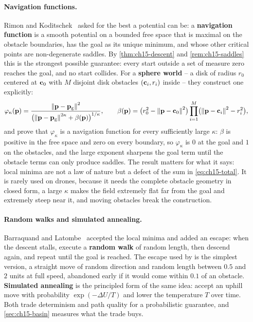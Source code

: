 \paragraph{Navigation functions.}
Rimon and Koditschek~\cite{rimon1992exact,koditschek1990navigation} asked
for the best a potential can be: a \textbf{navigation
function} is a smooth potential on a bounded free
space that is maximal on the obstacle boundaries, has the goal as its
unique minimum, and whose other critical points are non-degenerate saddles.
By \cref{thm:ch15-descent} and \cref{rem:ch15-saddles} this is the strongest
possible guarantee: every start outside a set of measure zero reaches the
goal, and no start collides. For a \textbf{sphere world}
-- a disk of radius $r_0$ centered at $\mathbf{c}_0$ with $M$ disjoint disk
obstacles $(\mathbf{c}_i, r_i)$ inside -- they construct one explicitly:
\begin{equation}
  \varphi_\kappa(\mathbf{p}) = \frac{\left\lVert \mathbf{p} - \mathbf{p}_{\mathrm{g}} \right\rVert^2}
    {\bigl( \left\lVert \mathbf{p} - \mathbf{p}_{\mathrm{g}} \right\rVert^{2\kappa} + \beta(\mathbf{p}) \bigr)^{1/\kappa}},
  \qquad
  \beta(\mathbf{p}) = \bigl( r_0^2 - \left\lVert \mathbf{p} - \mathbf{c}_0 \right\rVert^2 \bigr) \prod_{i=1}^{M} \bigl( \left\lVert \mathbf{p} - \mathbf{c}_i \right\rVert^2 - r_i^2 \bigr),
  \label{eq:ch15-navfun}
\end{equation}
and prove that $\varphi_\kappa$ is a navigation function for every
sufficiently large $\kappa$: $\beta$ is positive in the free space and zero on
every boundary, so $\varphi_\kappa$ is $0$ at the goal and $1$ on the
obstacles, and the large exponent sharpens the goal term until the obstacle
terms can only produce saddles. The result matters for what it says: local minima are not a law of nature but a defect of the sum
in \cref{eq:ch15-total}. It is rarely used on drones, because it needs the
complete obstacle geometry in closed form, a large $\kappa$ makes the field
extremely flat far from the goal and extremely steep near it, and moving
obstacles break the construction.

\paragraph{Random walks and simulated annealing.}
Barraquand and Latombe~\cite{barraquand1991distributed} accepted the local
minima and added an escape: when the descent stalls, execute a
\textbf{random walk} of random
length, then descend again, and repeat until the goal is reached. The escape
used by  is the simplest version, a straight move of
random direction and random length between $0.5$ and $2$ units at full
speed, abandoned early if it would come within $0.1$ of an obstacle.
\textbf{Simulated annealing} is the principled
form of the same idea: accept an uphill move with probability
$\exp(-\Delta U / T)$ and lower the temperature $T$ over time. Both trade
determinism and path quality for a probabilistic guarantee, and
\cref{sec:ch15-basin} measures what the trade buys.

